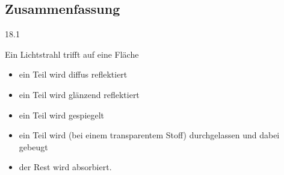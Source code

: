 \subsection{Zusammenfassung}
\begin{center}
 18.1
\end{center}
Ein Lichtstrahl trifft auf eine Fläche
\begin{itemize}
 \item ein Teil wird diffus reflektiert
 \item ein Teil wird glänzend reflektiert
 \item ein Teil wird gespiegelt
 \item ein Teil wird (bei einem transparentem Stoff) durchgelassen und dabei gebeugt
 \item der Rest wird absorbiert.
\end{itemize}

